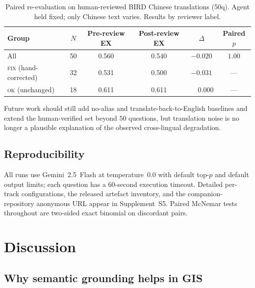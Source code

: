 \documentclass[11pt]{article}
\begin{document}
\begin{table}[t]
\centering
\caption{Paired re-evaluation on human-reviewed BIRD Chinese translations (50q). Agent held fixed; only Chinese text varies. Results by reviewer label.}
\label{tab:crosslingual-rereview}
\begin{tabular}{lccccc}
\toprule
Group & $N$ & Pre-review EX & Post-review EX & $\Delta$ & Paired $p$ \\
\midrule
All          & 50 & 0.560 & 0.540 & $-0.020$ & $1.00$ \\
\textsc{fix} (hand-corrected) & 32 & 0.531 & 0.500 & $-0.031$ & --- \\
\textsc{ok}  (unchanged)      & 18 & 0.611 & 0.611 & $\phantom{+}0.000$ & --- \\
\bottomrule
\end{tabular}
\end{table}

Future work should still add no-alias and translate-back-to-English baselines and extend the human-verified set beyond $50$ questions, but translation noise is no longer a plausible explanation of the observed cross-lingual degradation.

\subsection{Reproducibility}
\label{sec:repro}
All runs use Gemini~2.5~Flash at temperature~$0.0$ with default top-$p$ and default output limits; each question has a 60-second execution timeout. Detailed per-track configurations, the released artefact inventory, and the companion-repository anonymous URL appear in Supplement~S5. Paired McNemar tests throughout are two-sided exact binomial on discordant pairs.

\section{Discussion}
\label{sec:discussion}

\subsection{Why semantic grounding helps in GIS}
\end{document}
